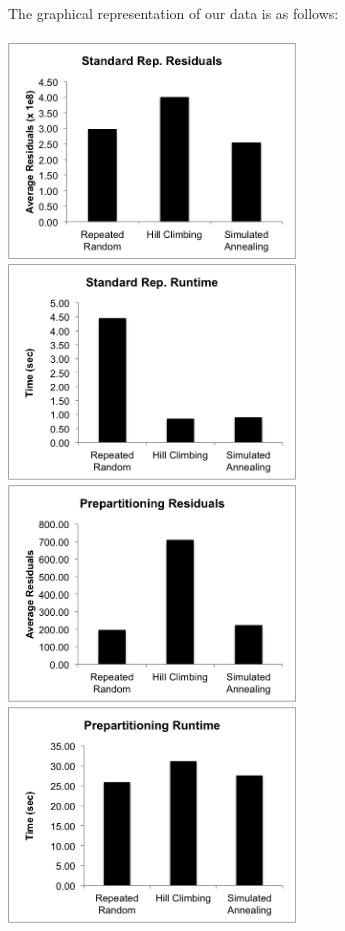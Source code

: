 \documentclass[a4paper]{article}
\begin{document}
	\vspace{0.2in}
	The graphical representation of our data is as follows:\\\\
	\includegraphics[width=3in]{ss_resid}
	\includegraphics[width=3in]{ss_time}\\
	\includegraphics[width=3in]{pp_resid}
	\includegraphics[width=3in]{pp_time}
	
\end{document}
